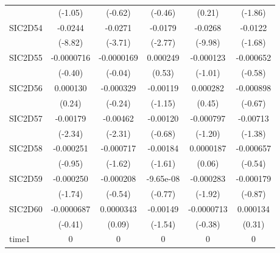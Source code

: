 \begin{table}[htbp]
\begin{tabular}{l*{5}{c}}
            &     (-1.05)         &     (-0.62)         &     (-0.46)         &      (0.21)         &     (-1.86)         \\
SIC2D54     &     -0.0244\sym{***}&     -0.0271\sym{***}&     -0.0179\sym{**} &     -0.0268\sym{***}&     -0.0122         \\
            &     (-8.82)         &     (-3.71)         &     (-2.77)         &     (-9.98)         &     (-1.68)         \\
SIC2D55     &  -0.0000716         &  -0.0000169         &    0.000249         &   -0.000123         &   -0.000652         \\
            &     (-0.40)         &     (-0.04)         &      (0.53)         &     (-1.01)         &     (-0.58)         \\
SIC2D56     &    0.000130         &   -0.000329         &    -0.00119         &    0.000282         &   -0.000898         \\
            &      (0.24)         &     (-0.24)         &     (-1.15)         &      (0.45)         &     (-0.67)         \\
SIC2D57     &    -0.00179\sym{*}  &    -0.00462\sym{*}  &    -0.00120         &   -0.000797         &    -0.00713         \\
            &     (-2.34)         &     (-2.31)         &     (-0.68)         &     (-1.20)         &     (-1.38)         \\
SIC2D58     &   -0.000251         &   -0.000717         &    -0.00184         &   0.0000187         &   -0.000657         \\
            &     (-0.95)         &     (-1.62)         &     (-1.61)         &      (0.06)         &     (-0.54)         \\
SIC2D59     &   -0.000250         &   -0.000208         &   -9.65e-08         &   -0.000283         &   -0.000179         \\
            &     (-1.74)         &     (-0.54)         &     (-0.77)         &     (-1.92)         &     (-0.87)         \\
SIC2D60     &  -0.0000687         &   0.0000343         &    -0.00149         &  -0.0000713         &    0.000134         \\
            &     (-0.41)         &      (0.09)         &     (-1.54)         &     (-0.38)         &      (0.31)         \\
time1       &           0         &           0         &           0         &           0         &           0         \\

\end{tabular}
\end{table}
